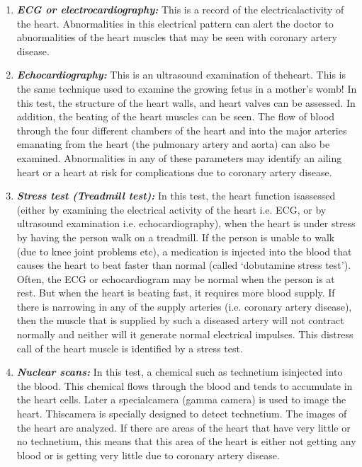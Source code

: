 \clearpage
\begin{enumerate}
\itemsep=0pt
\item \textbf{\textit{ECG or electrocardiography:}} This is a record of the electrical\break activity of the heart. Abnormalities in this electrical pattern can alert the doctor to abnormalities of the heart muscles that may be seen with coronary artery disease.
\item \textbf{\textit{Echocardiography:}} This is an ultrasound examination of the\break heart. This is the same technique used to examine the growing fetus in a mother’s womb! In this test, the structure of the heart walls, and heart valves can be assessed. In addition, the beating of the heart muscles can be seen. The flow of blood through the four different chambers of the heart and into the major arteries emanating from the heart (the pulmonary artery and aorta) can also be examined. Abnormalities in any of these parameters may identify an ailing heart or a heart at risk for complications due to coronary artery disease.
\item \textbf{\textit{Stress test (Treadmill test):}} In this test, the heart function is\break assessed (either by examining the electrical activity of the heart i.e. ECG, or by ultrasound examination i.e. echocardiography), when the heart is under stress by having the person walk on a treadmill. If the person is unable to walk (due to knee joint pro\-blems etc), a medication is injected into the blood that causes the heart to beat faster than normal (called ‘dobutamine stress test’). Often, the ECG or echocardiogram may be normal when the person is at rest. But when the heart is beating fast, it requires more blood supply. If there is narrowing in any of the supply arteries (i.e. coronary artery disease), then the muscle that is supplied by such a diseased artery will not contract normally and neither will it generate normal electrical impulses. This distress call of the heart muscle is identified by a stress test.
\item \textbf{\textit{Nuclear scans:}} In this test, a chemical such as technetium is\break injected into the blood. This chemical flows through the blood and tends to accumulate in the heart cells. Later a special\break camera (gamma camera) is used to image the heart. This\break camera is specially designed to detect technetium. The images of the heart are analyzed. If there are areas of the heart that have very little or no technetium, this means that this area of the heart is either not getting any blood or is getting very little due to coronary artery disease.
\end{enumerate}

